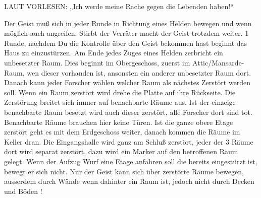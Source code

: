 LAUT VORLESEN: „Ich werde meine Rache gegen die Lebenden haben!“


  \begin{itemize}
        \bitem Der Geist muß sich in jeder Runde in Richtung eines Helden bewegen und wenn möglich auch angreifen. Stirbt der Verräter macht der Geist trotzdem weiter. 1 Runde, nachdem Du die Kontrolle über den Geist bekommen hast beginnt das Haus zu einzustürzen. Am Ende jedes Zuges eines Helden zerbricht ein unbesetzter Raum. Dies beginnt im Obergeschoss, zuerst im Attic/Mansarde-Raum, wen dieser vorhanden ist, ansonsten ein anderer unbesetzter Raum dort. Danach kann jeder Forscher wählen welcher Raum als nächstes Zerstört werden soll.
        \bitem Wenn ein Raum zerstört wird drehe die Platte auf ihre Rückseite. Die Zerstörung breitet sich immer auf benachbarte Räume aus. Ist der einzeige benachbarte Raum besetzt wird auch dieser zerstört, alle Forscher dort sind tot. Benachbarte Räume brauchen hier keine Türen.
        \bitem Ist die ganze obere Etage zerstört geht es mit dem Erdgeschoss weiter, danach kommen die Räume im Keller dran. Die Eingangshalle wird ganz am Schluß zerstört, jeder der 3 Räume dort wird separat zerstört, dazu wird ein Marker auf den betroffenen Raum gelegt.
        \bitem Wenn der Aufzug Wurf eine Etage anfahren soll die bereits eingestürzt ist, bewegt er sich nicht.
        \bitem Nur der Geist kann sich über zerstörte Räume bewegen, ausserdem durch Wände wenn dahinter ein Raum ist, jedoch nicht durch Decken und Böden !
    \end{itemize}



